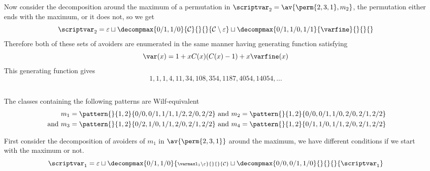 Now consider the decomposition around the maximum of a permutation in
\(\scriptvar_2 = \av{\perm{2,3,1},m_2}\), the permutation either ends with
the maximum, or it does not, so we get
\begin{equation*}
    \scriptvar_2 = \varepsilon \sqcup
    \decompmax{0/1,1/0}{\mathcal{C}}{}{}{\mathcal{C}\setminus\varepsilon} \sqcup
    \decompmax{0/1,1/0,1/1}{\mathcal{\varfine}}{}{}{}
\end{equation*}
Therefore both of these sets of avoiders are enumerated in the same manner
having generating function satisfying
\begin{equation*}
    \var(x) = 1 + xC(x)(C(x)-1) + x\varfine(x)
\end{equation*}
This generating function gives
\begin{equation*}
    1, 1, 1, 4, 11, 34, 108, 354, 1187, 4054, 14054,\dotsc
\end{equation*}


\subsection{}
\nextvar
The classes containing the following patterns are Wilf-equivalent
\begin{equation*}
    \begin{aligned}
        m_1 = \pattern{}{1,2}{0/0,0/1,1/1,1/2,2/0,2/2} &\text{ and }
        m_2 = \pattern{}{1,2}{0/0,0/1,1/0,2/0,2/1,2/2} \\
        \text{ and }
        m_3 = \pattern{}{1,2}{0/2,1/0,1/1,2/0,2/1,2/2} &\text{ and }
        m_4 = \pattern{}{1,2}{0/1,1/0,1/1,2/0,2/1,2/2}
    \end{aligned}
\end{equation*}

First consider the decomposition of avoiders of \(m_1\) in \(\av{\perm{2,3,1}}\)
around the maximum, we have different conditions if we start with the maximum or not.
\begin{equation*}
    \scriptvar_1 =
    \varepsilon \sqcup
    \decompmax{0/1,1/0}{\scriptstyle \mathcal{\varmaxl}_1\setminus\varepsilon}{}{}{\mathcal{C}}
    \sqcup
    \decompmax{0/0,0/1,1/0}{}{}{}{\scriptvar_1}
\end{equation*}

